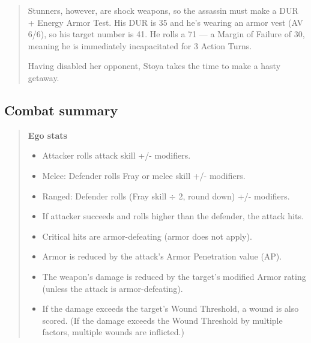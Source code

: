 \begin{quotation}
Stunners, however, are shock weapons, so the assassin must make a DUR + Energy Armor Test. His DUR is 35 and he’s wearing an armor vest (AV 6/6), so his target number is 41. He rolls a 71 --- a Margin of Failure of 30, meaning he is immediately incapacitated for 3 Action Turns. 

Having disabled her opponent, Stoya takes the time to make a hasty getaway. \end{quotation} 



\subsection{Combat summary} 

\begin{quotation} \textbf{Ego stats} \begin{itemize} \item Attacker rolls attack skill +/- modifiers. \item Melee: Defender rolls Fray or melee skill +/- modifiers. \item Ranged: Defender rolls (Fray skill $\div$ 2, round down) +/- modifiers. \item If attacker succeeds and rolls higher than the defender, the attack hits. \item Critical hits are armor-defeating (armor does not apply). \item Armor is reduced by the attack’s Armor Penetration value (AP). \item The weapon’s damage is reduced by the target’s modified Armor rating (unless the attack is armor-defeating). \item If the damage exceeds the target’s Wound Threshold, a wound is also scored. (If the damage exceeds the Wound Threshold by multiple factors, multiple wounds are inflicted.) \end{itemize} \end{quotation} 

